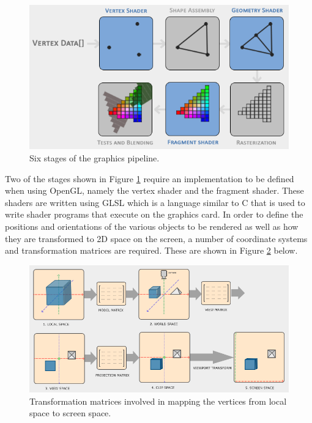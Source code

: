 \begin{figure}[H]
	\centering
	\includegraphics[width=0.7\linewidth]{figures/graphics-pipeline.PNG}
	\caption{Six stages of the graphics pipeline.}
	\label{fig:graphics-pipeline}
\end{figure}

Two of the stages shown in Figure \ref{fig:graphics-pipeline} require an implementation to be defined when using OpenGL, namely the vertex shader and the fragment shader. These shaders are written using GLSL which is a language similar to C that is used to write shader programs that execute on the graphics card. In order to define the positions and orientations of the various objects to be rendered as well as how they are transformed to 2D space on the screen, a number of coordinate systems and transformation matrices are required. These are shown in Figure \ref{fig:transformation-matrices} below.

\begin{figure}[H]
	\centering
	\includegraphics[width=1\linewidth]{figures/transformation-matrices.PNG}
	\caption{Transformation matrices involved in mapping the vertices from local space to screen space.}
	\label{fig:transformation-matrices}
\end{figure}

